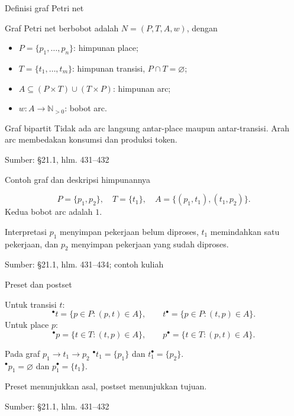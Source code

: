 \documentclass[aspectratio=169,11pt]{beamer}
\newcommand{\source}[1]{%
    \vfill
    \hfill{\tiny\color{gray}Sumber: #1}
}
\newcommand{\N}{\mathbb N}
\begin{document}
\begin{frame}{Definisi graf Petri net}

Graf Petri net berbobot adalah $N=(P,T,A,w)$, dengan
\begin{itemize}
\item $P=\{p_1,\ldots,p_n\}$: himpunan place;
\item $T=\{t_1,\ldots,t_m\}$: himpunan transisi, $P\cap T=\varnothing$;
\item $A\subseteq(P\times T)\cup(T\times P)$: himpunan arc;
\item $w:A\to\N_{>0}$: bobot arc.
\end{itemize}
\begin{block}{Graf bipartit}
Tidak ada arc langsung antar-place maupun antar-transisi.
Arah arc membedakan konsumsi dan produksi token.
\end{block}

\source{\S21.1, hlm. 431--432}
\end{frame}
\begin{frame}{Contoh graf dan deskripsi himpunannya}

\begin{center}\end{center}
\[
P=\{p_1,p_2\},\quad T=\{t_1\},\quad
A=\{(p_1,t_1),(t_1,p_2)\}.
\]
Kedua bobot arc adalah $1$.
\begin{exampleblock}{Interpretasi}
$p_1$ menyimpan pekerjaan belum diproses, $t_1$ memindahkan satu pekerjaan,
dan $p_2$ menyimpan pekerjaan yang sudah diproses.
\end{exampleblock}

\source{\S21.1, hlm. 431--434; contoh kuliah}
\end{frame}
\begin{frame}{Preset dan postset}

Untuk transisi $t$:
\[
{}^\bullet t=\{p\in P:(p,t)\in A\},\qquad
t^\bullet=\{p\in P:(t,p)\in A\}.
\]
Untuk place $p$:
\[
{}^\bullet p=\{t\in T:(t,p)\in A\},\qquad
p^\bullet=\{t\in T:(p,t)\in A\}.
\]
\begin{exampleblock}{Pada graf $p_1\to t_1\to p_2$}
\({}^\bullet t_1=\{p_1\}\) dan $t_1^\bullet=\{p_2\}$.\\
\({}^\bullet p_1=\varnothing\) dan $p_1^\bullet=\{t_1\}$.
\end{exampleblock}
Preset menunjukkan asal, postset menunjukkan tujuan.

\source{\S21.1, hlm. 431--432}
\end{frame}
\end{document}
